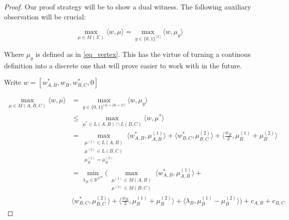 \begin{proof}
Our proof strategy will be to show a dual witness. The following auxiliary observation will be crucial:


\begin{equation}
\max_{ \mu \in M(\mathcal{X})} \langle w, \mu \rangle = \max_{ y \in \{0,1\}^{|\mathcal{X}|}} \langle w, \mu_y \rangle
\end{equation}

Where $\mu_y$ is defined as in \ref{eq_vertex}. This has the virtue of turning a continous definition into a discrete one that will prove easier to work with in the future. 

Write $w = [w_{A,B}^*, w_B, w_{B,C}^* , 0]$

\begin{align}
\max_{ \mu  \in M(A,B,C) } \langle w, \mu \rangle &= \max_{ y   \in \{0,1\}^{|A|+|B|+|C|} } \langle w, \mu_y \rangle  \label{eq_1} \\
& \leq \max_{ \mu^* \in L(A,B) \cap L(B,C)} \langle w, \mu^* \rangle  \label{ineq_1} \\
& = \max_{ \substack{ \mu^{(1)} \in L(A,B) \\
                      \mu^{(2)} \in L(B,C) \\
                      \mu^{(1)}_B = \mu^{(2)}_B }}   \langle w_{A,B}^*, \mu^{(1)}_{A,B} \rangle +  \langle w_{B,C}^*, \mu^{(2)}_{B,C} \rangle + \langle \frac{w_B}{2}, \mu_B^{(1)} + \mu_B^{(2)}\rangle \label{eq_2} \\
&= \min_{\lambda_B \in \mathbb{R}^{3^{|B|}}} \Big(    \max_{ \substack{ \mu^{(1)} \in M(A,B) \\
                      \mu^{(2)} \in M(B,C) }}   
                      \langle w_{A,B}^*, \mu^{(1)}_{A,B} \rangle + \\
                      &\langle w_{B,C}^*, \mu^{(2)}_{B,C} \rangle + \langle \frac{w_B}{2}, \mu_B^{(1)} + \mu_B^{(2)}\rangle + \langle \lambda_B, \mu_B^{(1)} - \mu_B^{(2)} \rangle
                      \Big) + c_{A,B} + c_{B,C} \label{eq_3} 
\end{align}




\end{proof}
